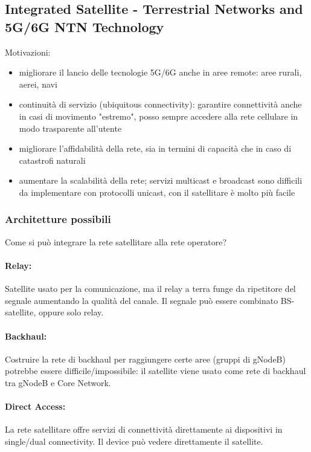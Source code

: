\subsection{Integrated Satellite - Terrestrial Networks and 5G/6G NTN Technology}

Motivazioni: 
\begin{itemize}
	\item migliorare il lancio delle tecnologie 5G/6G anche in aree remote: aree rurali, aerei, navi
	\item continuità di servizio (ubiquitous connectivity): garantire connettività anche in casi di movimento "estremo", posso sempre accedere alla rete cellulare in modo trasparente all'utente
	\item migliorare l'affidabilità della rete, sia in termini di capacità che in caso di catastrofi naturali
	\item aumentare la scalabilità della rete; servizi multicast e broadcast sono difficili da implementare con protocolli unicast, con il satellitare è molto più facile
\end{itemize}

\subsubsection{Architetture possibili}

Come si può integrare la rete satellitare alla rete operatore?

\paragraph{Relay:} Satellite usato per la comunicazione, ma il relay a terra funge da ripetitore del segnale aumentando la qualità del canale. Il segnale può essere combinato BS-satellite, oppure solo relay.

\paragraph{Backhaul:} Costruire la rete di backhaul per raggiungere certe aree (gruppi di gNodeB) potrebbe essere difficile/impossibile: il satellite viene usato come rete di backhaul tra gNodeB e Core Network.

\paragraph{Direct Access:} La rete satellitare offre servizi di connettività direttamente ai dispositivi in single/dual connectivity. Il device può vedere direttamente il satellite.\\

